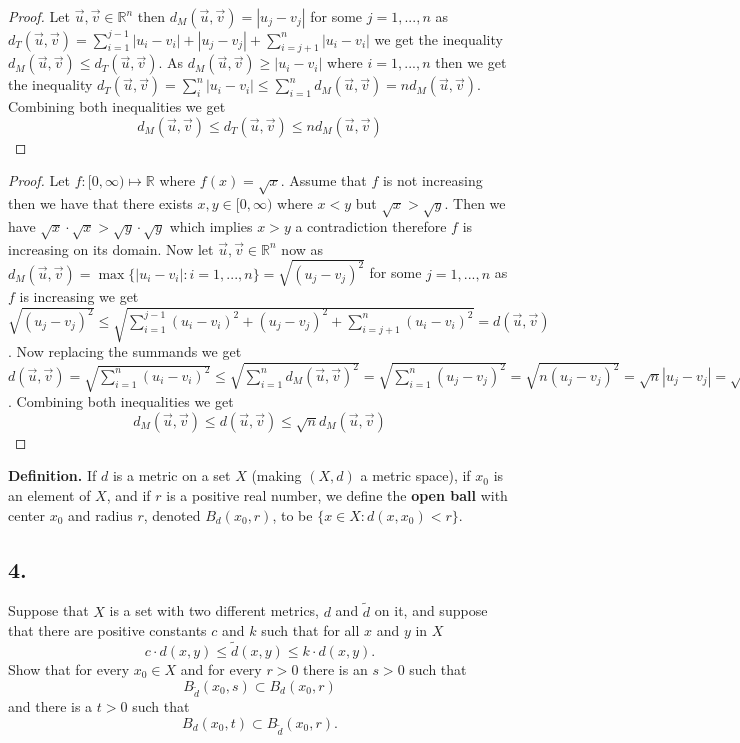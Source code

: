 \documentclass{amsart}
\theoremstyle{plain}
\theoremstyle{definition}
\theoremstyle{remark}
\begin{document}
\vspace{.15in}


\begin{proof}

    Let $\vec{u},\vec{v}\in \mathbb{R}^n$ then $d_M(\vec{u},\vec{v})=|u_j-v_j|$ for some $j=1,...,n$ as $d_T(\vec{u},\vec{v})=\sum_{i=1}^{j-1}|u_i-v_i|+|u_j-v_j|+\sum_{i=j+1}^{n}|u_i-v_i|$ we get the inequality $d_M(\vec{u},\vec{v})\leq d_T(\vec{u},\vec{v})$. As $d_M(\vec{u},\vec{v})\geq |u_i-v_i|$ where $i=1,...,n$ then we get the inequality $d_T(\vec{u},\vec{v})=\sum_{i}^{n}|u_i-v_i|\leq \sum_{i=1}^{n}d_M(\vec{u},\vec{v})=nd_M(\vec{u},\vec{v})$.
    Combining both inequalities we get $$d_M(\vec{u},\vec{v})\leq d_T(\vec{u},\vec{v})\leq nd_M(\vec{u},\vec{v})$$
\end{proof}

\begin{proof}
    Let $f:[0,\infty)\mapsto \mathbb{R}$ where $f(x)=\sqrt{x}$. Assume that $f$ is not increasing then we have that there exists $x,y\in [0,\infty)$ where $x<y$ but $\sqrt{x}>\sqrt{y}$. Then we have $\sqrt{x}\cdot \sqrt{x}> \sqrt{y}\cdot \sqrt{y}$ which implies $x>y$ a contradiction therefore $f$ is increasing on its domain. Now let $\vec{u},\vec{v}\in \mathbb{R}^n$ now as $d_M(\vec{u},\vec{v})=\max\{|u_i-v_i|:i=1,...,n\}=\sqrt{(u_j-v_j)^2}$ for some $j=1,...,n$ as $f$ is increasing we get $\sqrt{(u_j-v_j)^2}\leq \sqrt{\sum_{i=1}^{j-1}(u_i-v_i)^2+(u_j-v_j)^2+\sum_{i=j+1}^{n}(u_i-v_i)^2}=d(\vec{u},\vec{v})$. Now replacing the summands we get $d(\vec{u},\vec{v})=\sqrt{\sum_{i=1}^{n}(u_i-v_i)^2}\leq \sqrt{\sum_{i=1}^{n}d_M(\vec{u},\vec{v})^2}=\sqrt{\sum_{i=1}^{n}(u_j-v_j)^2}=\sqrt{n(u_j-v_j)^2}=\sqrt{n}|u_j-v_j|=\sqrt{n}d_M(\vec{u},\vec{v})$. Combining both inequalities we get $$d_M(\vec{u},\vec{v})\leq d(\vec{u},\vec{v})\leq \sqrt{n}d_M(\vec{u},\vec{v})$$
\end{proof}



\noindent
{\bfseries Definition.} If $d$ is a metric on a set $X$ (making $(X,d)$ a metric space), if $x_0$ is an element of $X$, and if $r$ is a positive real number, we define the {\bfseries open ball} with center $x_0$ and radius $r$, denoted $B_d(x_0, r)$, to be $\{ x\in X : d(x, x_0) < r\}$.

\vspace{.15in}

\noindent
\subsection*{4.} Suppose that $X$ is a set with two different metrics, $d$ and $\widetilde{d}$ on it, and suppose that there are positive constants $c$ and $k$ such that for all $x$ and $y$ in $X$
\[
    c\cdot d(x,y) \le \widetilde{d} (x,y) \le k\cdot d(x,y).
\]
Show that for every $x_0\in X$ and for every $r > 0$ there is an $s > 0$ such that
\[
    B_{\widetilde{d}} (x_0, s) \subset B_d (x_0, r)
\]
and there is a $t >0$ such that
\[
    B_d (x_0, t) \subset B_{\widetilde{d}} (x_0, r).
\]
\end{document}
